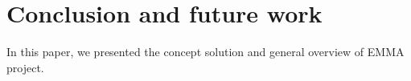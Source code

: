 \section{Conclusion and future work}


In this paper, we presented the concept solution and general overview of EMMA
project.

